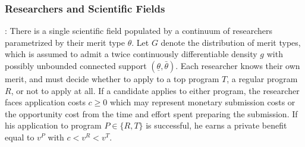 \documentclass[12pt,reqno]{amsart}
\theoremstyle{definition}
\theoremstyle{plain} %
\begin{document}
\subsubsection{Researchers and Scientific Fields}: There is a single scientific field populated by a continuum of researchers parametrized by their merit type $\theta$. Let $G$ denote the distribution of merit types, which is assumed to admit a twice continuously differentiable density $g$ with possibly unbounded connected support $(\underline{\theta},\bar{\theta})$. Each researcher knows their own merit, and must decide whether to apply to a top program $T$, a regular program $R$, or not to apply at all. If a candidate applies to either program, the researcher faces application costs $c\geq 0$ which may represent monetary submission costs or the opportunity cost from the time and effort spent preparing the submission. If his application to program $P\in \{R,T\}$ is successful, he earns a private benefit equal to $v^P$ with $c < v^R < v^T$.  
\end{document}
